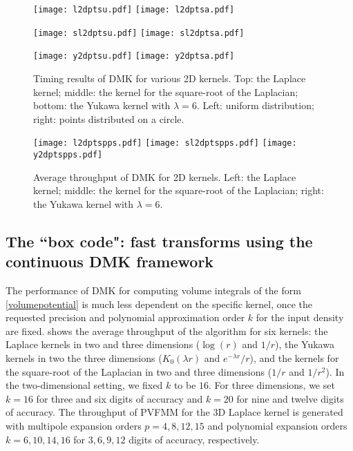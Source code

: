 \documentclass[final,letterpaper]{siamart171218}
\newcommand{\acron}{DMK }
\begin{document}
\begin{figure}[!ht]
\centering
\texttt{[image: l2dptsu.pdf]}
\hspace{0.4in}
\texttt{[image: l2dptsa.pdf]}

\vspace{5mm}

\texttt{[image: sl2dptsu.pdf]}
\hspace{0.4in}
\texttt{[image: sl2dptsa.pdf]}

\vspace{5mm}

\texttt{[image: y2dptsu.pdf]}
\hspace{0.4in}
\texttt{[image: y2dptsa.pdf]}

\caption{\sf Timing results of \acron for various 2D kernels.
  Top: the Laplace kernel; middle: the kernel for
  the square-root of the Laplacian; bottom: the Yukawa kernel with
  $\lambda=6$. Left: uniform distribution; right: 
  points distributed on a circle.}
\label{2dtimingresults}
\end{figure}

\begin{figure}[!ht]
\centering
\texttt{[image: l2dptspps.pdf]}
\hspace{0.1in}
\texttt{[image: sl2dptspps.pdf]}
\hspace{0.1in}
\texttt{[image: y2dptspps.pdf]}
\caption{\sf Average throughput of \acron for 2D kernels. Left: the
  Laplace kernel; middle: the kernel for the square-root of the Laplacian;
  right: the Yukawa kernel with $\lambda=6$.} 
\label{2dthroughput}
\end{figure}


\subsection{The ``box code": fast transforms using the continuous \acron framework}

The performance of \acron for computing volume integrals of the form 
\eqref{volumepotential} is much less dependent on the specific kernel, once the 
requested precision and polynomial approximation order $k$ for the input density
are fixed.
 shows the average throughput
of the algorithm for six kernels: the Laplace kernels in two and three dimensions 
($\log(r)$ and $1/r$), the Yukawa kernels in two the three dimensions
($K_0(\lambda r)$ and $e^{-\lambda r}/r$), and the kernels for the square-root 
of the Laplacian in two and three dimensions
($1/r$ and $1/r^2$). In the two-dimensional setting, we fixed 
$k$ to be $16$. For three dimensions, we set $k=16$ for three and six digits
of accuracy and $k=20$ for nine and twelve digits of accuracy. The throughput of PVFMM
for the 3D Laplace kernel is generated with multipole expansion orders $p=4, 8, 12, 15$
and polynomial expansion orders $k=6, 10, 14, 16$ for $3, 6, 9, 12$ digits of accuracy,
respectively.
\end{document}
